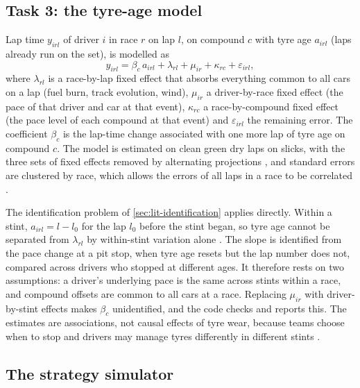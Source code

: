 \documentclass[12pt]{article}
\begin{document}
\subsection{Task 3: the tyre-age model}\label{sec:t3method}

Lap time $y_{irl}$ of driver $i$ in race $r$ on lap $l$, on compound $c$ with tyre age $a_{irl}$ (laps already run on the
set), is modelled as
\begin{equation}\label{eq:fe}
  y_{irl} = \beta_{c}\,a_{irl} + \lambda_{rl} + \mu_{ir} + \kappa_{rc} + \varepsilon_{irl},
\end{equation}
where $\lambda_{rl}$ is a race-by-lap fixed effect that absorbs everything common to all cars on a lap (fuel burn, track
evolution, wind), $\mu_{ir}$ a driver-by-race fixed effect (the pace of that driver and car at that event), $\kappa_{rc}$
a race-by-compound fixed effect (the pace level of each compound at that event) and $\varepsilon_{irl}$ the remaining
error. The coefficient $\beta_c$ is the lap-time change associated with one more lap of tyre age on compound $c$. The
model is estimated on clean green dry laps on slicks, with the three sets of fixed effects removed by alternating
projections \parencite{guimaraes2010,gaure2013}, and standard errors are clustered by race, which allows the errors of
all laps in a race to be correlated \parencite{cameron2015}.

The identification problem of \cref{sec:lit-identification} applies directly. Within a stint, $a_{irl}=l-l_0$ for the
lap $l_0$ before the stint began, so tyre age cannot be separated from $\lambda_{rl}$ by within-stint variation alone
\parencite{fosse2019}. The slope is identified from the pace change at a pit stop, when tyre age resets but the lap
number does not, compared across drivers who stopped at different ages. It therefore rests on two assumptions: a
driver's underlying pace is the same across stints within a race, and compound offsets are common to all cars at a race.
Replacing $\mu_{ir}$ with driver-by-stint effects makes $\beta_c$ unidentified, and the code checks and reports this.
The estimates are associations, not causal effects of tyre wear, because teams choose when to stop and drivers may manage
tyres differently in different stints \parencite{angrist2009}.

\subsection{The strategy simulator}\label{sec:simmethod}
\end{document}
